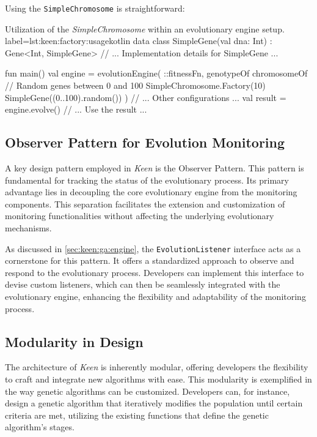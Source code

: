         Using the \texttt{SimpleChromosome} is straightforward:

        \begin{code}{
        Utilization of the \textit{SimpleChromosome} within an evolutionary 
        engine setup.
        }{label=lst:keen:factory:usage}{kotlin}
        data class SimpleGene(val dna: Int) : Gene<Int, SimpleGene> {
            // ... Implementation details for SimpleGene ...
        }
                
        fun main() {
            val engine = evolutionEngine(
                ::fitnessFn,
                genotypeOf {
                    chromosomeOf {
                        // Random genes between 0 and 100
                        SimpleChromosome.Factory(10) { SimpleGene((0..100).random()) }
                    }
                }
            ) {
                // ... Other configurations ...
            }
            val result = engine.evolve()
            // ... Use the result ...
        }
        \end{code}

    \subsection{Observer Pattern for Evolution Monitoring}
        A key design pattern employed in \textit{Keen} is the Observer Pattern. This
        pattern is fundamental for tracking the status of the evolutionary process.
        Its primary advantage lies in decoupling the core evolutionary engine from
        the monitoring components. This separation facilitates the extension and
        customization of monitoring functionalities without affecting the underlying
        evolutionary mechanisms.

        As discussed in \vref{sec:keen:ga:engine}, the \texttt{EvolutionListener}
        interface acts as a cornerstone for this pattern. It offers a standardized
        approach to observe and respond to the evolutionary process. Developers can
        implement this interface to devise custom listeners, which can then be
        seamlessly integrated with the evolutionary engine, enhancing the
        flexibility and adaptability of the monitoring process.

    \subsection{Modularity in Design}
        The architecture of \textit{Keen} is inherently modular, offering developers
        the flexibility to craft and integrate new algorithms with ease. This
        modularity is exemplified in the way genetic algorithms can be customized.
        Developers can, for instance, design a genetic algorithm that iteratively
        modifies the population until certain criteria are met, utilizing the
        existing functions that define the genetic algorithm's stages.

